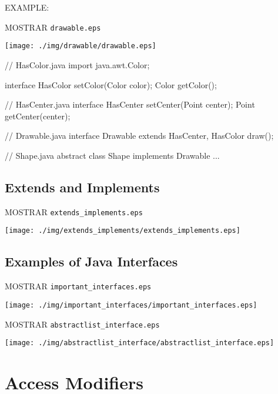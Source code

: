 \documentclass[a4paper, 9pt]{extarticle}
\begin{document}
EXAMPLE:

MOSTRAR \verb+drawable.eps+
\begin{center}
  \texttt{[image: ./img/drawable/drawable.eps]}
\end{center}

\begin{blackboard}
// HasColor.java
import java.awt.Color;

interface HasColor {
  setColor(Color color);
  Color getColor();
}

// HasCenter.java
interface HasCenter {
  setCenter(Point center);
  Point getCenter(center);
}

// Drawable.java
interface Drawable extends HasCenter, HasColor {
  draw();
}

// Shape.java
abstract class Shape implements Drawable {
  ...
}
\end{blackboard}


\subsection{Extends and Implements}

MOSTRAR \verb+extends_implements.eps+
\begin{center}
  \texttt{[image: ./img/extends\_implements/extends\_implements.eps]}
\end{center}

\subsection{Examples of Java Interfaces}

MOSTRAR \verb+important_interfaces.eps+
\begin{center}
  \texttt{[image: ./img/important\_interfaces/important\_interfaces.eps]}
\end{center}

MOSTRAR \verb+abstractlist_interface.eps+
\begin{center}
  \texttt{[image: ./img/abstractlist\_interface/abstractlist\_interface.eps]}
\end{center}















\section{Access Modifiers}
\end{document}
